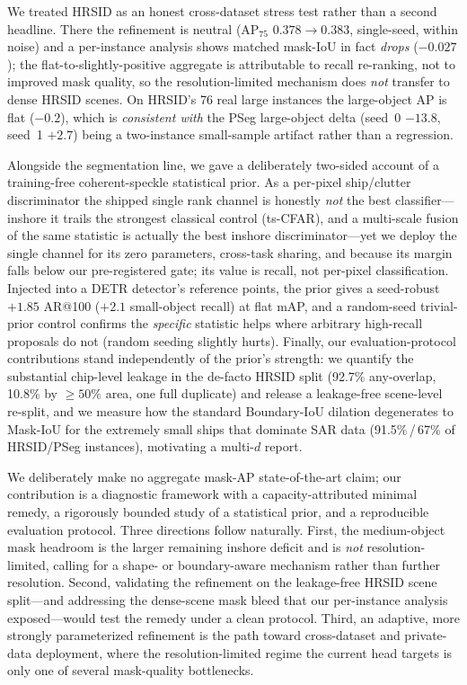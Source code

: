 We treated HRSID as an honest cross-dataset stress test rather than a second headline. There the refinement is neutral (AP$_{75}$ $0.378\!\rightarrow\!0.383$, single-seed, within noise) and a per-instance analysis shows matched mask-IoU in fact \emph{drops} ($-0.027$); the flat-to-slightly-positive aggregate is attributable to recall re-ranking, not to improved mask quality, so the resolution-limited mechanism does \emph{not} transfer to dense HRSID scenes. On HRSID's 76 real large instances the large-object AP is flat ($-0.2$), which is \emph{consistent with} the PSeg large-object delta (seed~0 $-13.8$, seed~1 $+2.7$) being a two-instance small-sample artifact rather than a regression.

Alongside the segmentation line, we gave a deliberately two-sided account of a training-free coherent-speckle statistical prior. As a per-pixel ship/clutter discriminator the shipped single rank channel is honestly \emph{not} the best classifier---inshore it trails the strongest classical control (ts-CFAR), and a multi-scale fusion of the same statistic is actually the best inshore discriminator---yet we deploy the single channel for its zero parameters, cross-task sharing, and because its margin falls below our pre-registered gate; its value is recall, not per-pixel classification. Injected into a DETR detector's reference points, the prior gives a seed-robust $+1.85$ AR@100 ($+2.1$ small-object recall) at flat mAP, and a random-seed trivial-prior control confirms the \emph{specific} statistic helps where arbitrary high-recall proposals do not (random seeding slightly hurts). Finally, our evaluation-protocol contributions stand independently of the prior's strength: we quantify the substantial chip-level leakage in the de-facto HRSID split (92.7\% any-overlap, 10.8\% by $\ge\!50\%$ area, one full duplicate) and release a leakage-free scene-level re-split, and we measure how the standard Boundary-IoU dilation degenerates to Mask-IoU for the extremely small ships that dominate SAR data (91.5\%\,/\,67\% of HRSID/PSeg instances), motivating a multi-$d$ report.

We deliberately make no aggregate mask-AP state-of-the-art claim; our contribution is a diagnostic framework with a capacity-attributed minimal remedy, a rigorously bounded study of a statistical prior, and a reproducible evaluation protocol. Three directions follow naturally. First, the medium-object mask headroom is the larger remaining inshore deficit and is \emph{not} resolution-limited, calling for a shape- or boundary-aware mechanism rather than further resolution. Second, validating the refinement on the leakage-free HRSID scene split---and addressing the dense-scene mask bleed that our per-instance analysis exposed---would test the remedy under a clean protocol. Third, an adaptive, more strongly parameterized refinement is the path toward cross-dataset and private-data deployment, where the resolution-limited regime the current head targets is only one of several mask-quality bottlenecks.